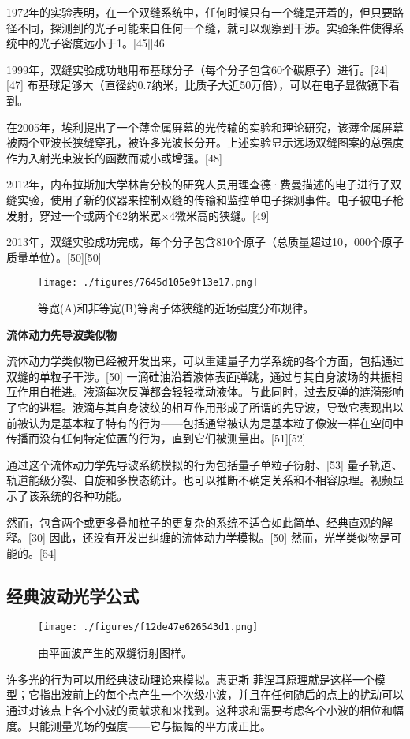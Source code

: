1972年的实验表明，在一个双缝系统中，任何时候只有一个缝是开着的，但只要路径不同，探测到的光子可能来自任何一个缝，就可以观察到干涉。实验条件使得系统中的光子密度远小于1。[45][46]

1999年，双缝实验成功地用布基球分子（每个分子包含60个碳原子）进行。[24][47] 布基球足够大（直径约0.7纳米，比质子大近50万倍），可以在电子显微镜下看到。

在2005年，埃利提出了一个薄金属屏幕的光传输的实验和理论研究，该薄金属屏幕被两个亚波长狭缝穿孔，被许多光波长分开。上述实验显示远场双缝图案的总强度作为入射光束波长的函数而减小或增强。[48]

2012年，内布拉斯加大学林肯分校的研究人员用理查德·费曼描述的电子进行了双缝实验，使用了新的仪器来控制双缝的传输和监控单电子探测事件。电子被电子枪发射，穿过一个或两个62纳米宽×4微米高的狭缝。[49]

2013年，双缝实验成功完成，每个分子包含810个原子（总质量超过10，000个原子质量单位）。[50][50]
\begin{figure}[ht]
\centering
\texttt{[image: ./figures/7645d105e9f13e17.png]}
\caption{等宽(A)和非等宽(B)等离子体狭缝的近场强度分布规律。} \label{fig_SFSY_6}
\end{figure}

\textbf{流体动力先导波类似物}

流体动力学类似物已经被开发出来，可以重建量子力学系统的各个方面，包括通过双缝的单粒子干涉。[50] 一滴硅油沿着液体表面弹跳，通过与其自身波场的共振相互作用自推进。液滴每次反弹都会轻轻搅动液体。与此同时，过去反弹的涟漪影响了它的进程。液滴与其自身波纹的相互作用形成了所谓的先导波，导致它表现出以前被认为是基本粒子特有的行为——包括通常被认为是基本粒子像波一样在空间中传播而没有任何特定位置的行为，直到它们被测量出。[51][52]

通过这个流体动力学先导波系统模拟的行为包括量子单粒子衍射、[53] 量子轨道、轨道能级分裂、自旋和多模态统计。也可以推断不确定关系和不相容原理。视频显示了该系统的各种功能。

然而，包含两个或更多叠加粒子的更复杂的系统不适合如此简单、经典直观的解释。[30] 因此，还没有开发出纠缠的流体动力学模拟。[50] 然而，光学类似物是可能的。[54]

\subsection{经典波动光学公式}
\begin{figure}[ht]
\centering
\texttt{[image: ./figures/f12de47e626543d1.png]}
\caption{由平面波产生的双缝衍射图样。} \label{fig_SFSY_7}
\end{figure}
许多光的行为可以用经典波动理论来模拟。惠更斯-菲涅耳原理就是这样一个模型；它指出波前上的每个点产生一个次级小波，并且在任何随后的点上的扰动可以通过对该点上各个小波的贡献求和来找到。这种求和需要考虑各个小波的相位和幅度。只能测量光场的强度——它与振幅的平方成正比。

